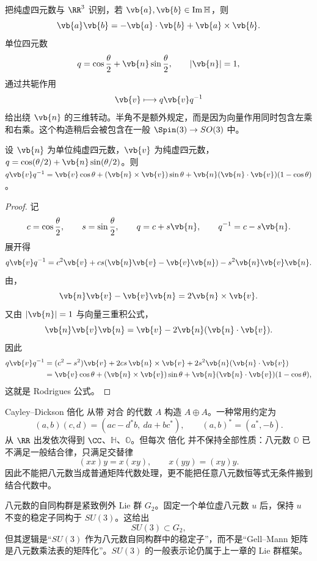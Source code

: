 把纯虚四元数与 $\RR^3$ 识别，若 $\vb{a},\vb{b}\in\operatorname{Im}\mathbb H$，则
\begin{equation}
\vb{a}\vb{b}
=-\vb{a}\cdot\vb{b}
+\vb{a}\times\vb{b}.
\label{eq:quaternion-dot-cross}
\end{equation}
单位四元数
\[
q=\cos\frac\theta2+\vb{n}\sin\frac\theta2,
\qquad
|\vb{n}|=1,
\]
通过共轭作用
\[
\vb{v}\longmapsto q\vb{v}q^{-1}
\]
给出绕 $\vb{n}$ 的三维转动。半角不是额外规定，而是因为向量作用同时包含左乘和右乘。这个构造稍后会被包含在一般 $\Spin(3)\to SO(3)$ 中。

\begin{proposition}
设 $\vb{n}$ 为单位纯虚四元数，$\vb{v}$ 为纯虚四元数，$q=\cos(\theta/2)+\vb{n}\sin(\theta/2)$。则 $q\vb{v}q^{-1}=\vb{v}\cos\theta+(\vb{n}\times\vb{v})\sin\theta+\vb{n}(\vb{n}\cdot\vb{v})(1-\cos\theta)$。
\end{proposition}
\begin{proof}
记
\[
c=\cos\frac\theta2,
\qquad
s=\sin\frac\theta2,
\qquad
q=c+s\vb{n},
\qquad
q^{-1}=c-s\vb{n}.
\]
展开得
\[
q\vb{v}q^{-1}
=c^2\vb{v}
+cs(\vb{n}\vb{v}-\vb{v}\vb{n})
-s^2\vb{n}\vb{v}\vb{n}.
\]
由，
\[
\vb{n}\vb{v}-\vb{v}\vb{n}
=2\vb{n}\times\vb{v}.
\]
又由 $|\vb{n}|=1$ 与向量三重积公式，
\[
\vb{n}\vb{v}\vb{n}
=
\vb{v}-2\vb{n}(\vb{n}\cdot\vb{v}).
\]
因此
\[
\begin{aligned}
q\vb{v}q^{-1}
&=(c^2-s^2)\vb{v}
+2cs\,\vb{n}\times\vb{v}
+2s^2\vb{n}(\vb{n}\cdot\vb{v})\\
&=
\vb{v}\cos\theta
+(\vb{n}\times\vb{v})\sin\theta
+\vb{n}(\vb{n}\cdot\vb{v})(1-\cos\theta),
\end{aligned}
\]
这就是 Rodrigues 公式。
\end{proof}


Cayley--Dickson 倍化 从带 对合 的代数 $A$ 构造 $A\oplus A$。一种常用约定为
\[
(a,b)(c,d)
=
(ac-d^*b,\ da+bc^*),
\qquad
(a,b)^*=(a^*,-b).
\]
从 $\RR$ 出发依次得到 $\CC$、$\mathbb H$、$\mathbb O$。但每次 倍化 并不保持全部性质：八元数 $\mathbb O$ 已不满足一般结合律，只满足交替律
\[
(xx)y=x(xy),
\qquad
x(yy)=(xy)y.
\]
因此不能把八元数当成普通矩阵代数处理，更不能把任意八元数恒等式无条件搬到结合代数中。

八元数的自同构群是紧致例外 Lie 群 $G_2$。固定一个单位虚八元数 $u$ 后，保持 $u$ 不变的稳定子同构于 $SU(3)$。这给出
\[
SU(3)\subset G_2,
\]
但其逻辑是“$SU(3)$ 作为八元数自同构群中的稳定子”，而不是“Gell--Mann 矩阵是八元数乘法表的矩阵化”。$SU(3)$ 的一般表示论仍属于上一章的 Lie 群框架。

